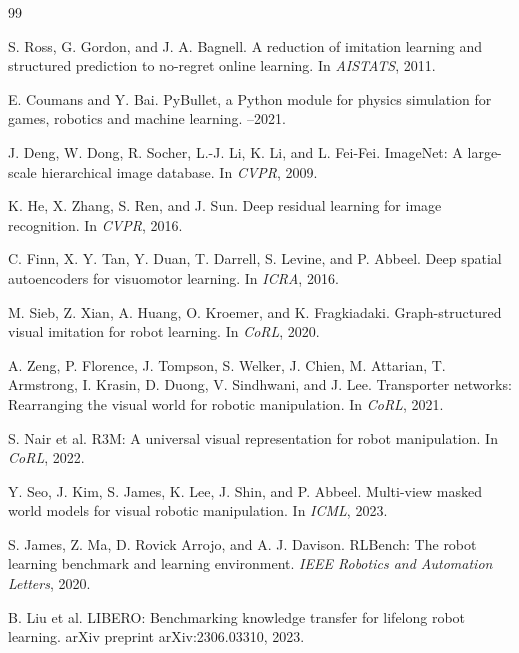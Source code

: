 \documentclass[10pt,twocolumn,letterpaper]{article}
\begin{document}
\begin{thebibliography}{99}
\small

S. Ross, G. Gordon, and J. A. Bagnell.
\newblock A reduction of imitation learning and structured prediction to no-regret online learning.
\newblock In \emph{AISTATS}, 2011.

E. Coumans and Y. Bai.
\newblock PyBullet, a Python module for physics simulation for games, robotics and machine learning.
--2021.

J. Deng, W. Dong, R. Socher, L.-J. Li, K. Li, and L. Fei-Fei.
\newblock ImageNet: A large-scale hierarchical image database.
\newblock In \emph{CVPR}, 2009.

K. He, X. Zhang, S. Ren, and J. Sun.
\newblock Deep residual learning for image recognition.
\newblock In \emph{CVPR}, 2016.

C. Finn, X. Y. Tan, Y. Duan, T. Darrell, S. Levine, and P. Abbeel.
\newblock Deep spatial autoencoders for visuomotor learning.
\newblock In \emph{ICRA}, 2016.

M. Sieb, Z. Xian, A. Huang, O. Kroemer, and K. Fragkiadaki.
\newblock Graph-structured visual imitation for robot learning.
\newblock In \emph{CoRL}, 2020.

A. Zeng, P. Florence, J. Tompson, S. Welker, J. Chien, M. Attarian, T. Armstrong, I. Krasin, D. Duong, V. Sindhwani, and J. Lee.
\newblock Transporter networks: Rearranging the visual world for robotic manipulation.
\newblock In \emph{CoRL}, 2021.

S. Nair et al.
\newblock R3M: A universal visual representation for robot manipulation.
\newblock In \emph{CoRL}, 2022.

Y. Seo, J. Kim, S. James, K. Lee, J. Shin, and P. Abbeel.
\newblock Multi-view masked world models for visual robotic manipulation.
\newblock In \emph{ICML}, 2023.

S. James, Z. Ma, D. Rovick Arrojo, and A. J. Davison.
\newblock RLBench: The robot learning benchmark and learning environment.
\newblock \emph{IEEE Robotics and Automation Letters}, 2020.

B. Liu et al.
\newblock LIBERO: Benchmarking knowledge transfer for lifelong robot learning.
\newblock arXiv preprint arXiv:2306.03310, 2023.


\end{thebibliography}
\end{document}
